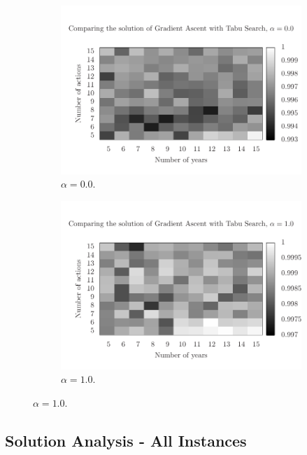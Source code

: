 \begin{figure}
  \begin{subfigure}{0.45\textwidth}
    \centering
    \includegraphics[scale=0.5, trim=0.75cm 0cm 0 2cm, clip=true]{imgs/comp_very_hard_sg_ts.pdf}
    \caption{$\alpha=0.0$.}
    \label{fig:comp_1}
  \end{subfigure}
  \hspace{1cm}
  \begin{subfigure}{0.45\textwidth}
    \centering
    \includegraphics[scale=0.5, trim=0.75cm 0cm 0 2cm, clip=true]{imgs/comp_easy_sg_ts.pdf}
    \caption{$\alpha=1.0$.}
    \label{fig:comp_3}
  \end{subfigure}
\end{figure}

\subsection{Solution Analysis - All Instances}

